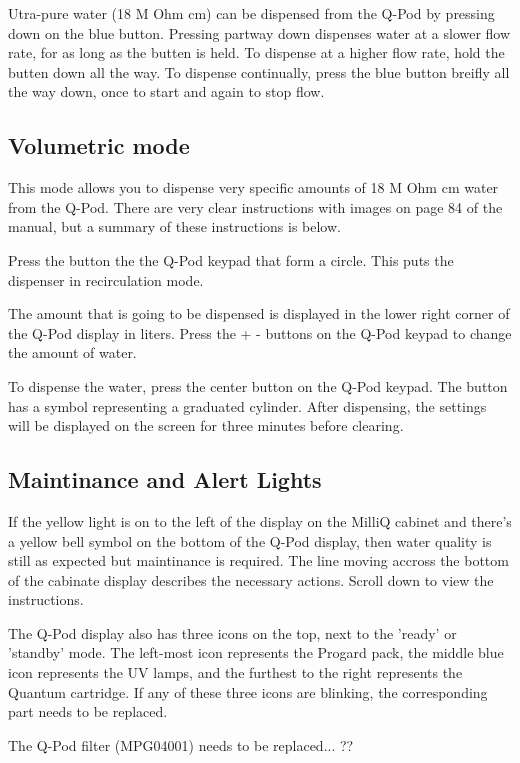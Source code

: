 \documentclass[12pt]{../SOP3_beta}\usepackage[]{graphicx}\usepackage[]{color}
\begin{document}
\NP Utra-pure water (18 M Ohm cm) can be dispensed from the Q-Pod by pressing down on the blue button. Pressing partway down dispenses water at a slower flow rate, for as long as the butten is held. To dispense at a higher flow rate, hold the butten down all the way. To dispense continually, press the blue button breifly all the way down, once to start and again to stop flow.  

\subsection{Volumetric mode}

\NP This mode allows you to dispense very specific amounts of 18 M Ohm cm water from the Q-Pod. There are very clear instructions with images on page 84 of the manual, but a summary of these instructions is below.

\NP Press the button the the Q-Pod keypad that form a circle. This puts the dispenser in recirculation mode. 

\NP The amount that is going to be dispensed is displayed in the lower right corner of the Q-Pod display in liters. Press the + - buttons on the Q-Pod keypad to change the amount of water. 

\NP To dispense the water, press the center button on the Q-Pod keypad. The button has a symbol representing a graduated cylinder. After dispensing, the settings will be displayed on the screen for three minutes before clearing.

\subsection{Maintinance and Alert Lights}

\NP If the yellow light is on to the left of the display on the MilliQ cabinet and there's a yellow bell symbol on the bottom of the Q-Pod display, then water quality is still as expected but maintinance is required. The line moving accross the bottom of the cabinate display describes the necessary actions. Scroll down to view the instructions. 

\NP The Q-Pod display also has three icons on the top, next to the 'ready' or 'standby' mode. The left-most icon represents the Progard pack, the middle blue icon represents the UV lamps, and the furthest to the right represents the Quantum cartridge. If any of these three icons are blinking, the corresponding part needs to be replaced.

\NP The Q-Pod filter (MPG04001) needs to be replaced... ?? 
\end{document}
